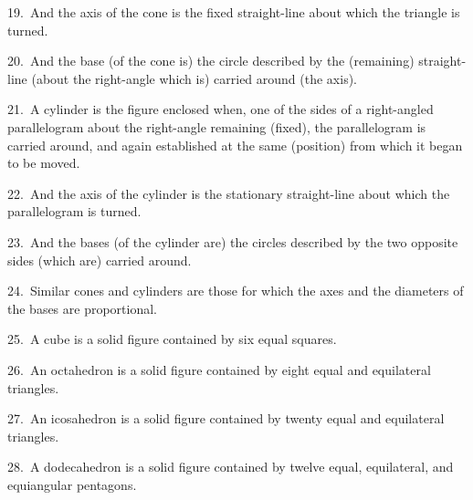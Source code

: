 \begin{Parallel}{}{}
{19.~And the axis of the cone is the fixed straight-line about which
 the triangle is turned.
 
20.~And the base (of the cone is) the circle described by the (remaining) straight-line (about the right-angle which is)
 carried around (the axis).
 
21.~A cylinder is the figure enclosed when, one of the sides
 of a right-angled parallelogram about the right-angle remaining (fixed),
 the parallelogram is carried around, and again established at the same
 (position) from which it began to be moved.
 
22.~And the axis of the cylinder is the stationary straight-line about which
 the parallelogram is turned.
 
23.~And the bases (of the cylinder are) the circles described by the
 two opposite sides (which are) carried around.
 
24.~Similar cones and cylinders are those for which the axes and the diameters
 of the bases are proportional.
 
25.~A cube is a solid figure contained by six equal squares.

26.~An octahedron is a solid figure contained by eight equal and
 equilateral triangles.
 
 27.~An icosahedron is a solid figure contained by twenty equal and
 equilateral triangles.
 
28.~A dodecahedron is a solid figure contained by twelve equal,
 equilateral, and equiangular pentagons.}
 \end{Parallel}
 
